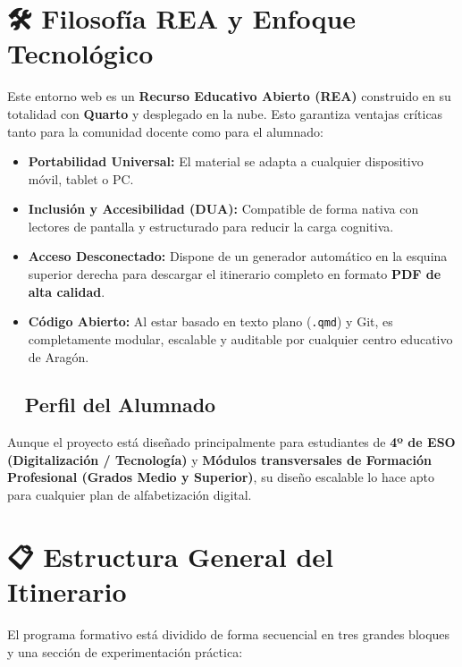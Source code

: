 \documentclass[
  spanish,
  letterpaper,
  DIV=11,
  numbers=noendperiod,
  oneside]{scrreprt}
\providecommand{\tightlist}{%
  \setlength{\itemsep}{0pt}\setlength{\parskip}{0pt}}
\begin{document}
\section{🛠️ Filosofía REA y Enfoque
Tecnológico}\label{filosofuxeda-rea-y-enfoque-tecnoluxf3gico}

Este entorno web es un \textbf{Recurso Educativo Abierto (REA)}
construido en su totalidad con \textbf{Quarto} y desplegado en la nube.
Esto garantiza ventajas críticas tanto para la comunidad docente como
para el alumnado:

\begin{itemize}
\tightlist
\item
  \textbf{Portabilidad Universal:} El material se adapta a cualquier
  dispositivo móvil, tablet o PC.
\item
  \textbf{Inclusión y Accesibilidad (DUA):} Compatible de forma nativa
  con lectores de pantalla y estructurado para reducir la carga
  cognitiva.
\item
  \textbf{Acceso Desconectado:} Dispone de un generador automático en la
  esquina superior derecha para descargar el itinerario completo en
  formato \textbf{PDF de alta calidad}.
\item
  \textbf{Código Abierto:} Al estar basado en texto plano
  (\texttt{.qmd}) y Git, es completamente modular, escalable y auditable
  por cualquier centro educativo de Aragón.
\end{itemize}

\subsection{👨‍🏫 Perfil del Alumnado}\label{perfil-del-alumnado}

Aunque el proyecto está diseñado principalmente para estudiantes de
\textbf{4º de ESO (Digitalización / Tecnología)} y \textbf{Módulos
transversales de Formación Profesional (Grados Medio y Superior)}, su
diseño escalable lo hace apto para cualquier plan de alfabetización
digital.

\section{📋 Estructura General del
Itinerario}\label{estructura-general-del-itinerario}

El programa formativo está dividido de forma secuencial en tres grandes
bloques y una sección de experimentación práctica:
\end{document}
